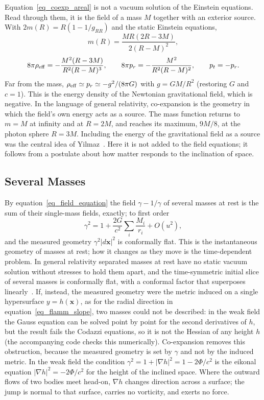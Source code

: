 \documentclass{iopjournal}
\begin{document}
Equation~\eqref{eq_coexp_areal} is not a vacuum solution of the Einstein equations. Read through them, it is the field of a mass $M$ together with an exterior source. With $2m(R)=R\left(1-1/g_{RR}\right)$ and the static Einstein equations,
\begin{equation}\label{eq_effective_mass}
    m(R)=\frac{MR(2R-3M)}{2(R-M)^2},
\end{equation}
\begin{equation}\label{eq_effective_source}
    8\pi\rho_{\rm eff}=-\frac{M^2(R-3M)}{R^2(R-M)^3},
    \qquad
    8\pi p_r=-\frac{M^2}{R^2(R-M)^2},
    \qquad
    p_t=-p_r .
\end{equation}
Far from the mass, $\rho_{\rm eff}\simeq p_r\simeq-g^2/(8\pi G)$ with $g=GM/R^2$ (restoring $G$ and $c=1$). This is the energy density of the Newtonian gravitational field, which is negative. In the language of general relativity, co-expansion is the geometry in which the field's own energy acts as a source. The mass function returns to $m=M$ at infinity and at $R=2M$, and reaches its maximum, $9M/8$, at the photon sphere $R=3M$. Including the energy of the gravitational field as a source was the central idea of Yilmaz~\cite{Yilmaz1958}. Here it is not added to the field equations; it follows from a postulate about how matter responds to the inclination of space.

\subsection{Several Masses}\label{sec_several_masses}

By equation~\eqref{eq_field_equation} the field $\gamma-1/\gamma$ of several masses at rest is the sum of their single-mass fields, exactly; to first order
\begin{equation}
    \gamma^2=1+\frac{2G}{c^2}\sum_i\frac{M_i}{r_i}+O\!\left(u^2\right),
\end{equation}
and the measured geometry $\gamma^2|d\mathbf{x}|^2$ is conformally flat. This is the instantaneous geometry of masses at rest; how it changes as they move is the time-dependent problem. In general relativity separated masses at rest have no static vacuum solution without stresses to hold them apart, and the time-symmetric initial slice of several masses is conformally flat, with a conformal factor that superposes linearly~\cite{BrillLindquist1963}. If, instead, the measured geometry were the metric induced on a single hypersurface $y=h(\mathbf{x})$, as for the radial direction in equation~\eqref{eq_flamm_slope}, two masses could not be described: in the weak field the Gauss equation can be solved point by point for the second derivatives of $h$, but the result fails the Codazzi equations, so it is not the Hessian of any height $h$ (the accompanying code checks this numerically). Co-expansion removes this obstruction, because the measured geometry is set by $\gamma$ and not by the induced metric. In the weak field the condition $\gamma^2=1+|\nabla h|^2=1-2\Phi/c^2$ is the eikonal equation $|\nabla h|^2=-2\Phi/c^2$ for the height of the inclined space. Where the outward flows of two bodies meet head-on, $\nabla h$ changes direction across a surface; the jump is normal to that surface, carries no vorticity, and exerts no force.
\end{document}
